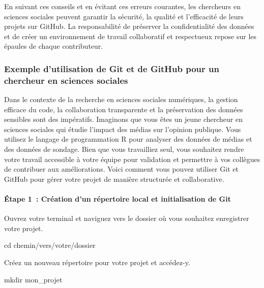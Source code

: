 \documentclass[
  letterpaper,
  DIV=11,
  numbers=noendperiod]{scrreprt}
\let\oldparagraph\paragraph
\renewcommand{\paragraph}[1]{\oldparagraph{#1}\mbox{}}
\newenvironment{Shaded}{\begin{snugshade}}{\end{snugshade}}
\newcommand{\BuiltInTok}[1]{\textcolor[rgb]{0.00,0.23,0.31}{#1}}
\newcommand{\FunctionTok}[1]{\textcolor[rgb]{0.28,0.35,0.67}{#1}}
\newcommand{\NormalTok}[1]{\textcolor[rgb]{0.00,0.23,0.31}{#1}}
\begin{document}
En suivant ces conseils et en évitant ces erreurs courantes, les
chercheurs en sciences sociales peuvent garantir la sécurité, la qualité
et l'efficacité de leurs projets sur GitHub. La responsabilité de
préserver la confidentialité des données et de créer un environnement de
travail collaboratif et respectueux repose sur les épaules de chaque
contributeur.

\subsubsection{Exemple d'utilisation de Git et de GitHub pour un
chercheur en sciences
sociales}\label{exemple-dutilisation-de-git-et-de-github-pour-un-chercheur-en-sciences-sociales}

Dans le contexte de la recherche en sciences sociales numériques, la
gestion efficace du code, la collaboration transparente et la
préservation des données sensibles sont des impératifs. Imaginons que
vous êtes un jeune chercheur en sciences sociales qui étudie l'impact
des médias sur l'opinion publique. Vous utilisez le langage de
programmation R pour analyser des données de médias et des données de
sondage. Bien que vous travailliez seul, vous souhaitez rendre votre
travail accessible à votre équipe pour validation et permettre à vos
collègues de contribuer aux améliorations. Voici comment vous pouvez
utiliser Git et GitHub pour gérer votre projet de manière structurée et
collaborative.

\paragraph{Étape 1~: Création d'un répertoire local et initialisation de
Git}\label{uxe9tape-1-cruxe9ation-dun-ruxe9pertoire-local-et-initialisation-de-git}

Ouvrez votre terminal et naviguez vers le dossier où vous souhaitez
enregistrer votre projet.

\begin{Shaded}
\begin{Highlighting}[]
\BuiltInTok{cd}\NormalTok{ chemin/vers/votre/dossier}
\end{Highlighting}
\end{Shaded}

Créez un nouveau répertoire pour votre projet et accédez-y.

\begin{Shaded}
\begin{Highlighting}[]
\FunctionTok{mkdir}\NormalTok{ mon\_projet}
\end{Highlighting}
\end{Shaded}
\end{document}
